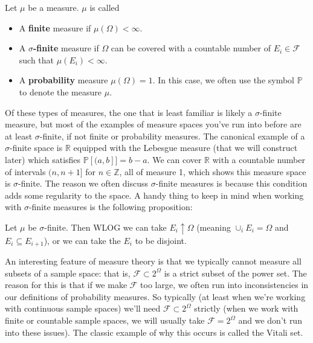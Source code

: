 \begin{definition}
	Let $\mu$ be a measure. $\mu$ is called 
	\begin{itemize}
		\item A \textbf{finite} measure if $\mu(\Omega) < \infty$.
		\item A \textbf{$\sigma$-finite} measure if $\Omega$ can be covered with a countable number of $E_i\in\mathcal F$ such that $\mu(E_i) < \infty$. 
		\item A \textbf{probability} measure $\mu(\Omega) = 1$. In this case, we often use the symbol $\mathbb P$ to denote the measure $\mu$.
	\end{itemize}
\end{definition}
Of these types of measures, the one that is least familiar is likely a $\sigma$-finite measure, but most of the examples of measure spaces you've run into before are at least $\sigma$-finite, if not finite or probability measures. The canonical example of a $\sigma$-finite space is $\mathbb R$ equipped with the Lebesgue measure (that we will construct later) which satisfies $\mathbb P[(a, b]] = b - a$. We can cover $\mathbb R$ with a countable number of intervals $(n, n + 1]$ for $n\in\mathbb Z$, all of measure 1, which shows this measure space is $\sigma$-finite. The reason we often discuss $\sigma$-finite measures is because this condition adds some regularity to the space. A handy thing to keep in mind when working with $\sigma$-finite measures is the following proposition:
\begin{prop}
	Let $\mu$ be $\sigma$-finite. Then WLOG we can take $E_i\uparrow\Omega$ (meaning $\cup_i E_i = \Omega$ and $E_i\subseteq E_{i + 1}$), or we can take the $E_i$ to be disjoint. 
\end{prop}

An interesting feature of measure theory is that we typically cannot measure all subsets of a sample space: that is, $\mathcal F\subset 2^\Omega$ is a strict subset of the power set. The reason for this is that if we make $\mathcal F$ too large, we often run into inconsistencies in our definitions of probability measures. So typically (at least when we're working with continuous sample spaces) we'll need $\mathcal F\subset 2^\Omega$ strictly (when we work with finite or countable sample spaces, we will usually take $\mathcal F = 2^\Omega$ and we don't run into these issues). The classic example of why this occurs is called the Vitali set. 

